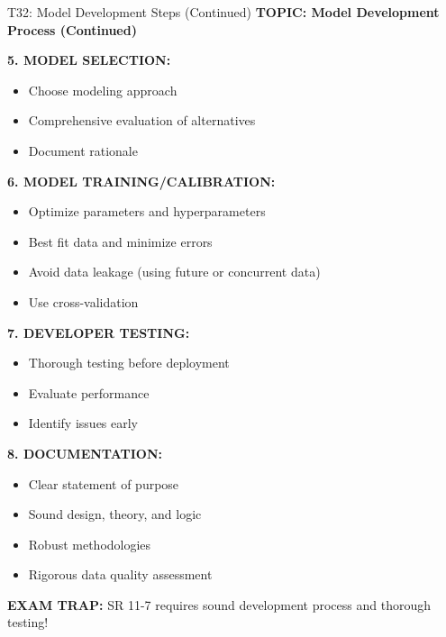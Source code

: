 \documentclass[8pt]{beamer}
\begin{document}
	\begin{frame}{T32: Model Development Steps (Continued)}
		\fontsize{6.5}{7.5}\selectfont
		\textbf{TOPIC: Model Development Process (Continued)}
		
		\vspace{0.1cm}
		\textbf{5. MODEL SELECTION:}
		\begin{itemize}
			\item Choose modeling approach
			\item Comprehensive evaluation of alternatives
			\item Document rationale
		\end{itemize}
		
		\vspace{0.1cm}
		\textbf{6. MODEL TRAINING/CALIBRATION:}
		\begin{itemize}
			\item Optimize parameters and hyperparameters
			\item Best fit data and minimize errors
			\item Avoid data leakage (using future or concurrent data)
			\item Use cross-validation
		\end{itemize}
		
		\vspace{0.1cm}
		\textbf{7. DEVELOPER TESTING:}
		\begin{itemize}
			\item Thorough testing before deployment
			\item Evaluate performance
			\item Identify issues early
		\end{itemize}
		
		\vspace{0.1cm}
		\textbf{8. DOCUMENTATION:}
		\begin{itemize}
			\item Clear statement of purpose
			\item Sound design, theory, and logic
			\item Robust methodologies
			\item Rigorous data quality assessment
		\end{itemize}
		
		\textcolor{myred}{\textbf{EXAM TRAP:}} SR 11-7 requires \textcolor{myblue}{sound development process and thorough testing}!
	\end{frame}
	
\end{document}
